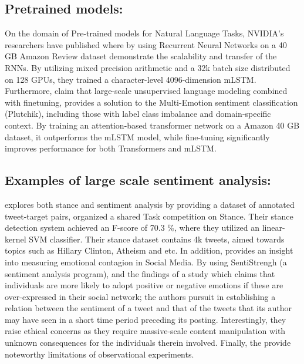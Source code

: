 \documentclass[11pt]{article}
\begin{document}
\subsection{Pretrained models:}
On the domain of Pre-trained models for Natural Language Tasks, NVIDIA's researchers have published 
\cite{puri2018large} where by using Recurrent Neural Networks on a 40 GB Amazon Review dataset demonstrate 
the scalability and transfer of the RNNs. By utilizing mixed precision arithmetic and 
a 32k batch size distributed on 128 GPUs, they trained a character-level 4096-dimension mLSTM.
Furthermore, \cite{kant2018practical} claim that large-scale unsupervised language modeling combined 
with finetuning, provides a solution to the Multi-Emotion sentiment classification (Plutchik),
including those with label class imbalance and domain-specific context. By training an attention-based
transformer network on a Amazon 40 GB dataset, it outperforms the mLSTM model, while fine-tuning significantly 
improves performance for both Transformers and mLSTM.

\subsection{Examples of large scale sentiment analysis:}
\cite{mohammad2017stance} explores both stance and sentiment analysis by providing a dataset of annotated tweet-target pairs, organized
a shared Task competition on Stance. Their stance detection system achieved an F-score of 70.3 \%, where they utilized an linear-kernel
SVM classifier. Their stance dataset contains 4k tweets, aimed towards topics such as Hillary Clinton, Atheism and etc. In addition,
\cite{yang2015twitter} provides an insight into measuring emotional contagion in Social Media. By using SentiStrengh (a sentiment analysis program),
and the findings of a study which claims that individuals are more likely to adopt positive or negative emotions if these are over-expressed in
their social network; the authors pursuit in establishing a relation between the sentiment of a tweet and that of the tweets that its author may have seen in a short
time period preceding its posting. Interestingly, they raise ethical concerns as they require massive-scale content manipulation with unknown consequences for the individuals therein involved.
Finally, the provide noteworthy limitations of observational experiments.
\end{document}
